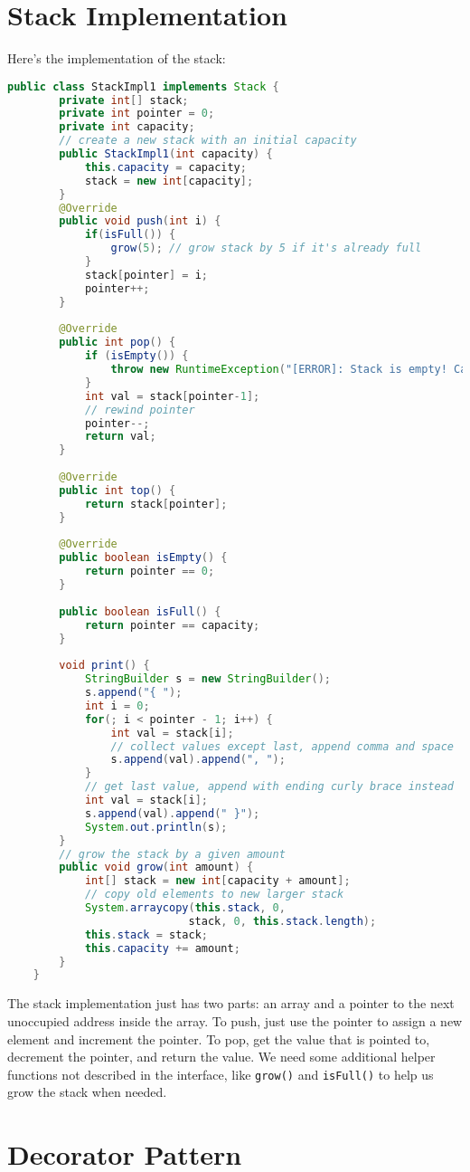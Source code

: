 \documentclass[english,12pt]{article}
\begin{document}
\section*{Stack Implementation}
Here's the implementation of the stack:
\begin{lstlisting}[language=java]
    public class StackImpl1 implements Stack {
        private int[] stack;
        private int pointer = 0;
        private int capacity;
        // create a new stack with an initial capacity
        public StackImpl1(int capacity) {
            this.capacity = capacity;
            stack = new int[capacity];
        }
        @Override
        public void push(int i) {
            if(isFull()) {
                grow(5); // grow stack by 5 if it's already full
            }
            stack[pointer] = i;
            pointer++;
        }
    
        @Override
        public int pop() {
            if (isEmpty()) {
                throw new RuntimeException("[ERROR]: Stack is empty! Cannot pop an element!");
            }
            int val = stack[pointer-1];
            // rewind pointer
            pointer--;
            return val;
        }
    
        @Override
        public int top() {
            return stack[pointer];
        }
    
        @Override
        public boolean isEmpty() {
            return pointer == 0;
        }
    
        public boolean isFull() {
            return pointer == capacity;
        }
    
        void print() {
            StringBuilder s = new StringBuilder();
            s.append("{ ");
            int i = 0;
            for(; i < pointer - 1; i++) {
                int val = stack[i];
                // collect values except last, append comma and space
                s.append(val).append(", ");
            }
            // get last value, append with ending curly brace instead
            int val = stack[i];
            s.append(val).append(" }");
            System.out.println(s);
        }
        // grow the stack by a given amount
        public void grow(int amount) {
            int[] stack = new int[capacity + amount];
            // copy old elements to new larger stack
            System.arraycopy(this.stack, 0, 
                            stack, 0, this.stack.length);
            this.stack = stack;
            this.capacity += amount;
        }
    } 
\end{lstlisting}
The stack implementation just has two parts: an array and a pointer to the next
unoccupied address inside the array. To push, just use the pointer to assign a new
element and increment the pointer. To pop, get the value that is pointed to,
decrement the pointer, and return the value. We need some additional helper functions
not described in the interface, like \texttt{grow()} and \texttt{isFull()} to help 
us grow the stack when needed.
\section*{Decorator Pattern}
\end{document}
